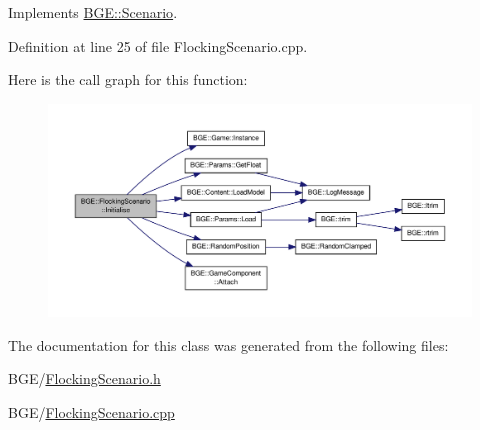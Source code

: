 Implements \hyperlink{class_b_g_e_1_1_scenario_a0fe2ffbe5e12855af787ed716cf9b977}{B\-G\-E\-::\-Scenario}.



Definition at line 25 of file Flocking\-Scenario.\-cpp.



Here is the call graph for this function\-:
\nopagebreak
\begin{figure}[H]
\begin{center}
\leavevmode
\includegraphics[width=350pt]{class_b_g_e_1_1_flocking_scenario_a18761ac65f511ee3d7f35a2a2662ca6b_cgraph}
\end{center}
\end{figure}




The documentation for this class was generated from the following files\-:\begin{DoxyCompactItemize}
\item 
B\-G\-E/\hyperlink{_flocking_scenario_8h}{Flocking\-Scenario.\-h}\item 
B\-G\-E/\hyperlink{_flocking_scenario_8cpp}{Flocking\-Scenario.\-cpp}\end{DoxyCompactItemize}
